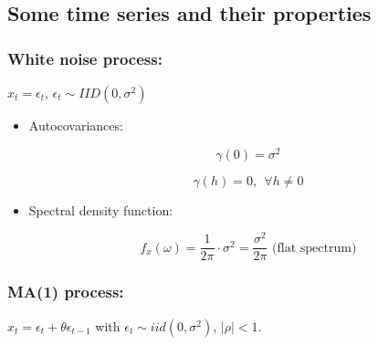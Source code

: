 %
%
%
%
%
%
%
%

\subsection{Some time series and their properties}


\subsubsection{White noise process:}  \(x_t = \epsilon_t\), \(\epsilon_t \sim IID(0, \sigma^2)\)

\begin{itemize}

\item Autocovariances: 

\[
\gamma(0) = \sigma^2
\]

\[
\gamma(h) =0, \ \ \forall h \neq 0
\]

\item Spectral density function:

\[
f_x(\omega) = \frac{1}{2\pi} \cdot \sigma^2 = \frac{\sigma^2}{2 \pi} \text{ (flat spectrum)}
\]

\end{itemize}


\subsubsection{MA(1) process:} \(x_t = \epsilon_t + \theta \epsilon_{t-1}\) with \(\epsilon_t \sim iid(0, \sigma^2)\), \(|\rho| < 1\). 

